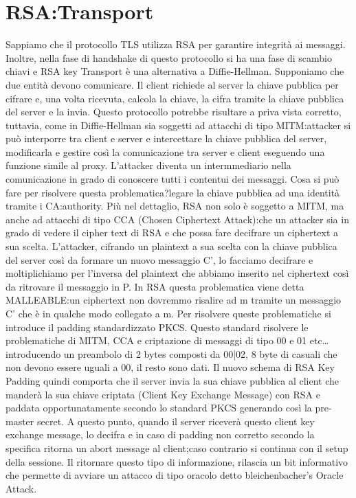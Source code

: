 \documentclass{article}
\begin{document}
\section{RSA:\@Key Transport}
Sappiamo che il protocollo TLS utilizza RSA per garantire integrità ai messaggi\@. Inoltre, nella fase di handshake di questo protocollo si ha una fase di scambio chiavi e RSA key Transport è una alternativa a Diffie-Hellman\@.\newline
Supponiamo che due entità devono comunicare\@. Il client richiede al server la chiave pubblica per cifrare e, una volta ricevuta, calcola la chiave, la cifra tramite la chiave pubblica del server e la invia\@.
Questo protocollo potrebbe risultare a priva vista corretto, tuttavia, come in Diffie-Hellman sia soggetti ad attacchi di tipo MITM:\@un attacker si può interporre tra client e server e intercettare la chiave pubblica del server, modificarla e gestire così la comunicazione tra server e client eseguendo una funzione simile al proxy\@. L'attacker diventa un intermmediario nella comunicazione in grado di conoscere tutti i contentui dei messaggi\@.\newline
Cosa si può fare per risolvere questa problematica?\@Occorre legare la chiave pubblica ad una identità tramite i CA:\@certificate authority\@.\newline
Più nel dettaglio, RSA non solo è soggetto a MITM, ma anche ad attacchi di tipo CCA (Chosen Ciphertext Attack):\@supponiamo che un attacker sia in grado di vedere il cipher text di RSA e che possa fare decifrare un ciphertext a sua scelta\@. L'attacker, cifrando un plaintext a sua scelta con la chiave pubblica del server così da formare un nuovo messaggio C', lo facciamo decifrare e moltiplichiamo per l'inversa del plaintext che abbiamo inserito nel ciphertext così da ritrovare il messaggio in P\@. In RSA questa problematica viene detta MALLEABLE:\@noto un ciphertext non dovremmo risalire ad m tramite un messaggio C' che è in qualche modo collegato a m\@.\newline
Per risolvere queste problematiche si introduce il padding standardizzato PKCS\@. Questo standard risolvere le problematiche di MITM, CCA e criptazione di messaggi di tipo 00 e 01 etc\dots introducendo un preambolo di 2 bytes composti da 00|02, 8 byte di casuali che non devono essere uguali a 00, il resto sono dati\@.\newline
Il nuovo schema di RSA Key Padding quindi comporta che il server invia la sua chiave pubblica al client che manderà la sua chiave criptata (Client Key Exchange Message) con RSA e paddata opportunatamente secondo lo standard PKCS generando così la pre-master secret\@. A questo punto, quando il server riceverà questo client key exchange message, lo decifra e in caso di padding non corretto secondo la specifica ritorna un abort message al client;\@in caso contrario si continua con il setup della sessione\@.\newline
Il ritornare questo tipo di informazione, rilascia un bit informativo che permette di avviare un attacco di tipo oracolo detto bleichenbacher's Oracle Attack\@.
\end{document}
